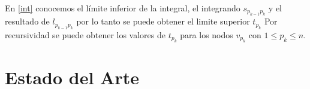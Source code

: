 \documentclass[letter, 10pt]{article}
\begin{document}
En \eqref{int} conocemos el límite inferior de la integral, el integrando $ s_{p_{k-1}p_k}$ y el resultado de $ l_{p_{k-1}p_k} $ por lo tanto se puede obtener el limite superior $t_{p_k}$
Por recursividad se puede obtener los valores de $t_{p_k}$ para los nodos $v_{p_k}$ con  $1\leq p_k \leq n$.




\section{Estado del Arte}
\end{document}
